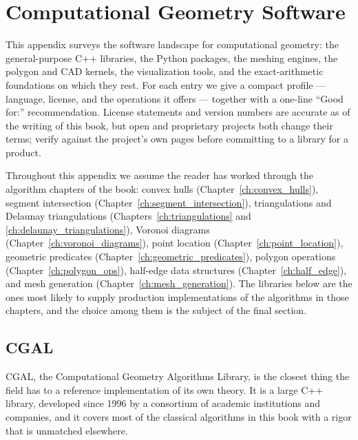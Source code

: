 \chapter{Computational Geometry Software}
\label{app:software}

This appendix surveys the software landscape for computational geometry:
the general-purpose C++ libraries, the Python packages, the meshing
engines, the polygon and CAD kernels, the visualization tools, and the
exact-arithmetic foundations on which they rest. For each entry we give a
compact profile --- language, license, and the operations it offers ---
together with a one-line ``Good for:'' recommendation. License statements
and version numbers are accurate as of the writing of this book, but open
and proprietary projects both change their terms; verify against the
project's own pages before committing to a library for a product.

Throughout this appendix we assume the reader has worked through the
algorithm chapters of the book: convex hulls
(Chapter~\ref{ch:convex_hulls}), segment intersection
(Chapter~\ref{ch:segment_intersection}), triangulations and Delaunay
triangulations (Chapters~\ref{ch:triangulations} and
\ref{ch:delaunay_triangulations}), Voronoi diagrams
(Chapter~\ref{ch:voronoi_diagrams}), point location
(Chapter~\ref{ch:point_location}), geometric predicates
(Chapter~\ref{ch:geometric_predicates}), polygon operations
(Chapter~\ref{ch:polygon_ops}), half-edge data structures
(Chapter~\ref{ch:half_edge}), and mesh generation
(Chapter~\ref{ch:mesh_generation}). The libraries below are the ones most
likely to supply production implementations of the algorithms in those
chapters, and the choice among them is the subject of the final section.

\section{CGAL}
\label{sec:app_soft_cgal}

CGAL, the Computational Geometry Algorithms Library, is the closest thing
the field has to a reference implementation of its own theory. It is a
large C++ library, developed since 1996 by a consortium of academic
institutions and companies, and it covers most of the classical
algorithms in this book with a rigor that is unmatched elsewhere.

